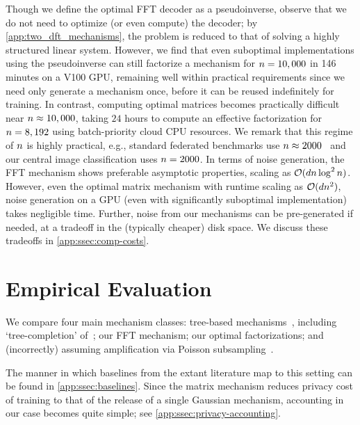\documentclass{article} %
\theoremstyle{named}
\begin{document}
Though we define the optimal FFT decoder as a pseudoinverse, observe that we do not need to optimize (or even compute) the decoder; by \cref{app:two_dft_mechanisms}, the problem is reduced to that of solving a highly structured linear system. However, we find that even suboptimal implementations using the pseudoinverse can still factorize a mechanism for $n=10,000$ in 146 minutes on a V100 GPU, remaining well within practical requirements since we need only generate a mechanism once, before it can be reused indefinitely for training. In contrast, computing optimal matrices becomes practically difficult near $n\approx10,000$, taking $24$ hours to compute an effective factorization for $n=8,192$ using batch-priority cloud CPU resources. We remark that this regime of $n$ is highly practical, e.g., standard federated benchmarks use $n\approx 2000$~\citep{reddi20adaptive} and our central image classification uses $n=2000$.
In terms of noise generation, the FFT mechanism shows preferable asymptotic properties, scaling as $\mathcal{O}(dn\log^2{n})$. However, even the optimal matrix mechanism with runtime scaling as $\mathcal{O}(dn^2)$, noise generation on a GPU (even with significantly suboptimal implementation) takes negligible time. Further, noise from our mechanisms can be pre-generated if needed, at a tradeoff in the (typically cheaper) disk space. We discuss these tradeoffs in \cref{app:ssec:comp-costs}.

\section{Empirical Evaluation}\label{sec:empirical-eval}
We compare four main mechanism classes: tree-based mechanisms~\citep{honaker_trick}, including `tree-completion' of~\citet{kairouz2021practical}; our FFT mechanism; our optimal factorizations; and \DPSGD (incorrectly) assuming amplification via Poisson subsampling~\citep{dpsgd_2016}.

The manner in which baselines from the extant literature map to this setting can be found in \cref{app:ssec:baselines}.
Since the matrix mechanism reduces privacy cost of training to that of the release of a single Gaussian mechanism, accounting in our case becomes quite simple; see \cref{app:ssec:privacy-accounting}.
\end{document}
